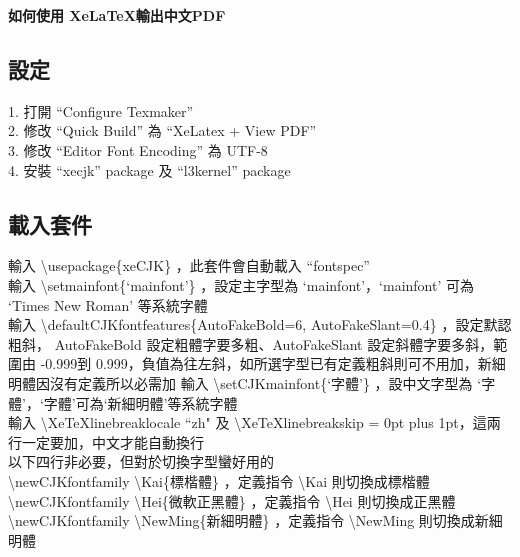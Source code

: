\documentclass[12pt, a4paper]{article}
\begin{document}
\begin{center} \Large \textbf{如何使用 Xe\LaTeX 輸出中文PDF} \end{center}

\subsection*{設定}
1. 打開 ``Configure Texmaker''\\
2. 修改 ``Quick Build'' 為 ``XeLatex + View PDF''\\
3. 修改 ``Editor Font Encoding'' 為 UTF-8\\
4. 安裝 ``xecjk'' package 及 ``l3kernel'' package

\subsection*{載入套件}
輸入 \textbackslash usepackage\{xeCJK\} ，此套件會自動載入 ``fontspec''\\
輸入 \textbackslash setmainfont\{`mainfont'\} ，設定主字型為 `mainfont'，`mainfont' 可為 `Times New Roman' 等系統字體\\
輸入 \textbackslash defaultCJKfontfeatures\{AutoFakeBold=6, AutoFakeSlant=0.4\} ，設定默認粗斜，\linebreak
AutoFakeBold 設定粗體字要多粗、AutoFakeSlant 設定斜體字要多斜，範圍由 -0.999到 0.999，負值為往左斜，如所選字型已有定義粗斜則可不用加，新細明體因沒有定義所以必需加
輸入 \textbackslash setCJKmainfont\{`字體'\} ，設中文字型為 `字體'，`字體'可為`新細明體'等系統字體\\
輸入 \textbackslash XeTeXlinebreaklocale ``zh" 及 \textbackslash XeTeXlinebreakskip = 0pt plus 1pt，這兩行一定要加，中文才能自動換行\\
以下四行非必要，但對於切換字型蠻好用的\\
\textbackslash newCJKfontfamily \textbackslash Kai\{標楷體\} ，定義指令 \textbackslash Kai 則切換成標楷體\\
\textbackslash newCJKfontfamily \textbackslash Hei\{微軟正黑體\} ，定義指令 \textbackslash Hei 則切換成正黑體\\
\textbackslash newCJKfontfamily \textbackslash NewMing\{新細明體\} ，定義指令 \textbackslash NewMing 則切換成新細明體
\end{document}
